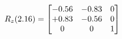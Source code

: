 \documentclass[preview]{standalone}
\begin{document}
\begin{align*}
\special{dvisvgm:raw <g id='unique000'>}R_{z}(2.16) = \begin{bmatrix}-0.56 & -0.83 & 0 \\+0.83 & -0.56 & 0 \\0 & 0 & 1\end{bmatrix}\special{dvisvgm:raw </g>}
\end{align*}
\end{document}
